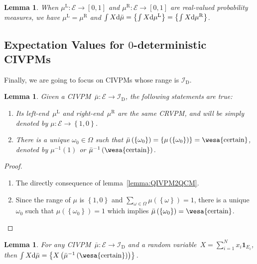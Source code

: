 \documentclass[12pt]{iopart}
\theoremstyle{plain}
\newtheorem{lemma}[thm]{Lemma}
\theoremstyle{definition}
\theoremstyle{remark}
\newcommand{\events}{\ensuremath{\mathcal{E}}}
\newcommand{\pmeas}{\ensuremath{\mu}}
\newcommand{\necess}{{\mbox{\wesa{certain}}}}
\newcommand{\mul}[1][]{\ensuremath{\mu^{\mathrm{L{#1}}}}}
\newcommand{\mur}[1][]{\ensuremath{\mu^{\mathrm{R{#1}}}}}
\begin{document}
\begin{lemma}\label{lemma:Choquet-Lebesgue}\cite{Grabisch2016}When
$\mul:\events\rightarrow\left[0,1\right]$ and $\mur:\events\rightarrow\left[0,1\right]$
are real-valued probability measures, we have $\mul=\mur$ and $\int X\rmd\bar{\mu}=\left\{ \int X\rmd\mul\right\} =\left\{ \int X\rmd\mur\right\} $.\end{lemma}

\subsection{Expectation Values for $0$-deterministic CIVPMs}

Finally, we are going to focus on CIVPMs whose range is $\mathscr{I}_{\mathrm{D}}$.

\begin{lemma}\label{lemma:deterministic-CIVPM}Given a CIVPM~$\bar{\mu}:\events\rightarrow\mathscr{I}_{\mathrm{D}}$,
the following statements are true:
\begin{enumerate}
\item Its left-end~$\mul$ and right-end~$\mur$ are the same CRVPM, and
will be simply denoted by $\pmeas:\events\rightarrow\left\{ 1,0\right\} $.
\item There is a unique $\omega_{0}\in\Omega$ such that $\bar{\mu}\left(\left\{ \omega_{0}\right\} \right)=\left\{ \pmeas\left(\left\{ \omega_{0}\right\} \right)\right\} =\necess$,
denoted by $\pmeas^{-1}\left(1\right)$ or $\bar{\mu}^{-1}\left(\necess\right)$.
\end{enumerate}
\end{lemma}

\begin{proof}~
\begin{enumerate}
\item The directly consequence of lemma~\ref{lemma:QIVPM2QCM}.
\item Since the range of $\pmeas$ is $\left\{ 1,0\right\} $ and $\sum_{\omega\in\Omega}\pmeas\left(\left\{ \omega\right\} \right)=1$,
there is a unique $\omega_{0}$ such that $\mu\left(\left\{ \omega_{0}\right\} \right)=1$
which implies $\bar{\mu}\left(\left\{ \omega_{0}\right\} \right)=\necess$.
\end{enumerate}
\end{proof}

\begin{lemma}\label{lemma:deterministic-CIVPM-expectation}For any
CIVPM~$\bar{\mu}:\events\rightarrow\mathscr{I}_{\mathrm{D}}$ and
a random variable~$X=\sum_{i=1}^{N}x_{i}\mathbf{1}_{E_{i}}$, then
$\int X\rmd\bar{\mu}=\left\{ X\left(\bar{\mu}^{-1}\left(\necess\right)\right)\right\} $.\end{lemma}
\end{document}
